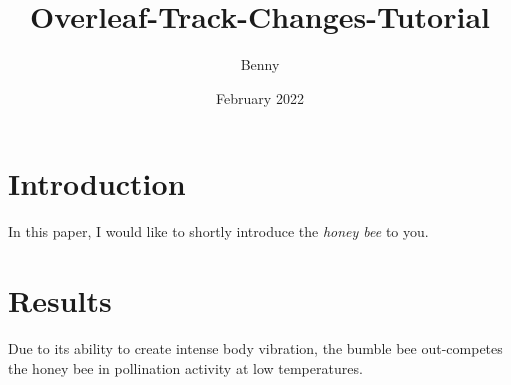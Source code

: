 \documentclass{article}
\title{Overleaf-Track-Changes-Tutorial}
\author{Benny}
\date{February 2022}
\begin{document}
\maketitle

\section{Introduction}

In this paper, I would like to shortly introduce the \textit{honey bee} to you.

\section{Results}

Due to its ability to create intense body vibration, the bumble bee out-competes the honey bee in pollination activity at low temperatures.
\end{document}
